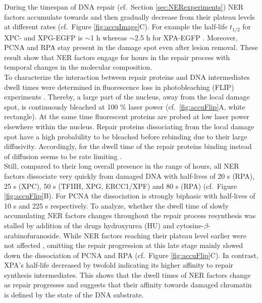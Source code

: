 During the timespan of DNA repair (cf.\ Section \ref{sec:NERexperiments}) NER factors accumulate towards and then gradually decrease from their plateau levels at different rates (cf.\ Figure \ref{fig:accuImage}C). For example the half-life $t_\text{1/2}$ for XPC- and XPG-EGFP is $\sim$1 h whereas $\sim$2.5 h for XPA-EGFP \cite{Luijsterburg2010}. Moreover, PCNA and RPA stay present in the damage spot even after lesion removal. These result show that NER factors engage for hours in the repair process with temporal changes in the molecular composition.\\
To characterize the interaction between repair proteins and DNA intermediates dwell times were determined in fluorescence loss in photobleaching (FLIP) experiments \cite{Luijsterburg2010}. Thereby, a large part of the nucleus, away from the local damage spot, is continuously bleached at 100 \% laser power (cf.\ \ref{fig:accuFlip}A, white rectangle). At the same time fluorescent proteins are probed at low laser power elsewhere within the nucleus. Repair proteins dissociating from the local damage spot have a high probability to be bleached before rebinding due to their large diffusivity. Accordingly, for the dwell time of the repair proteins binding instead of diffusion seems to be rate limiting \cite{Luijsterburg2010}.\\
Still, compared to their long overall presence in the range of hours, all NER factors dissociate very quickly from damaged DNA with half-lives of 20 s (RPA), 25 s (XPC), 50 s (TFIIH, XPG, ERCC1/XPF) and 80 s (RPA) (cf.\ Figure \ref{fig:accuFlip}B). For PCNA the dissociation is strongly biphasic with half-lives of 10 s and 225 s respectively. To analyze, whether the dwell time of slowly accumulating NER factors changes throughout the repair process  resynthesis was stalled by addition of the drugs hydroxyurea (HU) and cytosine-$\beta$-arabinofuranoside. While NER factors reaching their plateau level earlier were not affected \cite{Luijsterburg2010}, omitting the repair progression at this late stage mainly slowed down the dissociation of PCNA and RPA (cf.\ Figure \ref{fig:accuFlip}C). In contrast, XPA's half-life decreased by twofold indicating its higher affinity to repair synthesis intermediates. This shows that the dwell times of NER factors change as repair progresses and suggests that their affinity towards damaged chromatin is defined by the state of the DNA substrate.      
           
